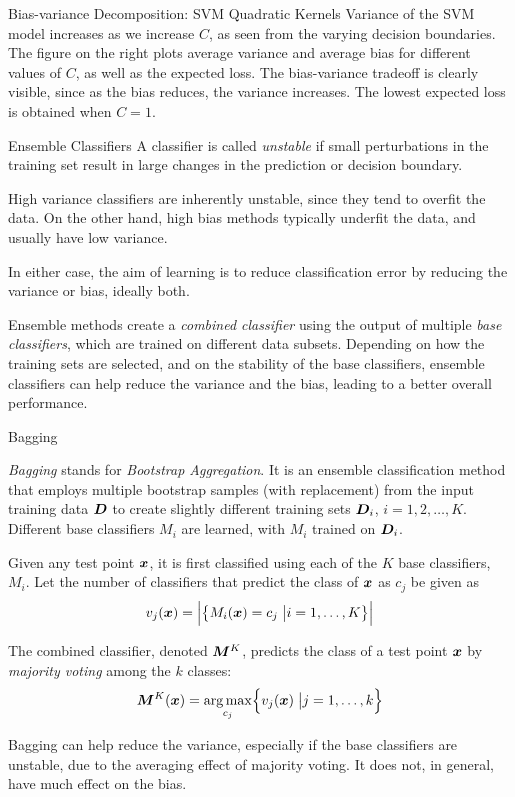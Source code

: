 \begin{frame}[fragile]{Bias-variance Decomposition: SVM Quadratic Kernels}
\small
Variance of the SVM model increases as we increase $C$, as seen
from the varying decision boundaries. The figure on the right plots
average variance and average bias for different values of $C$, as well
as the expected loss. The bias-variance tradeoff is clearly visible,
since as the bias reduces, the variance increases.  The lowest expected
loss is obtained when $C=1$.
\end{frame}



\begin{frame}{Ensemble Classif\/{i}ers}
A classif\/{i}er is called {\em unstable} if small perturbations in the
training set result in large changes in the prediction or decision
boundary. 

\medskip
High variance classif\/{i}ers are inherently unstable, since they
tend to overf\/{i}t the data.
On the other hand, high bias methods typically underf\/{i}t the data, and usually have
low variance.

\medskip
In either case, the aim of learning is to reduce classif\/{i}cation
error by reducing the variance or bias, ideally both.

\medskip
Ensemble methods create a {\em combined classif\/{i}er} using the
output of multiple {\em base classif\/{i}ers}, which are
trained on different data subsets. Depending on how the training
sets are selected, and on the stability of the base classif\/{i}ers,
ensemble classif\/{i}ers can help reduce the variance and the bias, leading
to a better overall performance.
\end{frame}



\begin{frame}{Bagging}

{\em Bagging} stands for {\em Bootstrap Aggregation}. It is an
ensemble classif\/{i}cation method that employs multiple bootstrap samples
(with replacement) from the input training data ${\boldsymbol D}$ to create
slightly different training sets ${\boldsymbol D}_i$, $i=1,2,\ldots,K$.
Different base classif\/{i}ers $M_i$ are
learned, with $M_i$ trained on ${\boldsymbol D}_i$.

\medskip Given any test point ${\boldsymbol x}$, it is f\/{i}rst classif\/{i}ed
using each of the $K$ base classif\/{i}ers, $M_i$. Let the number of
classif\/{i}ers that predict the class of ${\boldsymbol x}$ as $c_{j}$ be given as
\begin{align*}
v_{j}({\boldsymbol x}) =
\Bigl|\bigl\{M_i({\boldsymbol x}) = c_{j} \;\bigl| i = 1,\ldots,K\bigr\} \Bigr|
\end{align*}


The combined classif\/{i}er, denoted ${\boldsymbol M}^K$, predicts the class of a
test point ${\boldsymbol x}$ by {\em majority voting} among the $k$ classes:
\begin{align*}
  {\boldsymbol M}^K({\boldsymbol x}) = \mathop{\arg\max}_{c_{j}} \Bigl\{ v_{j}({\boldsymbol x}) \;\bigl| j=1,\ldots,k \Bigr\}
\end{align*}

Bagging can help reduce the variance, especially if the base
classif\/{i}ers are unstable, due to the averaging effect of majority
voting. It does not, in general, have much effect on the bias.
\end{frame}

